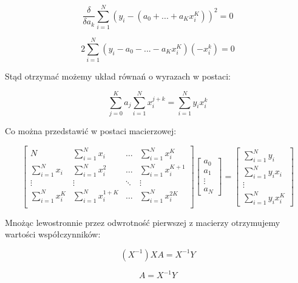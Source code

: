 \documentclass[a4paper]{article}
\begin{document}
\begin{equation}
\frac{\delta}{\delta a_k}\sum_{i=1}^N \left( y_i - \left(a _0 + ... + a_K x_i^K \right)\right)^2 = 0
\end{equation}

\begin{equation}
2\sum_{i=1}^N \left( y_i - a_0 - ... - a_K x_i^K \right) (- x_i^k) = 0
\end{equation}

Stąd otrzymać możemy układ równań o wyrazach w postaci:

\begin{equation}
\sum_{j=0}^K a_j \sum_{i=1}^N x_i^{j+k} = \sum_{i=1}^N y_i x_i^k
\end{equation}

Co można przedstawić w postaci macierzowej:

\begin{equation} \label{matrices}
\begin{bmatrix}
    N      & \sum_{i=1}^N x_i & \dots & \sum_{i=1}^N x_i^{K} \\
    \sum_{i=1}^N x_i      & \sum_{i=1}^N x_i^2 & \dots & \sum_{i=1}^N x_i^{K+1} \\
    \vdots & \vdots & \ddots & \vdots \\
\sum_{i=1}^N x_i^K      & \sum_{i=1}^N x_i^{1+K} & \dots & \sum_{i=1}^N x_i^{2K}\\
\end{bmatrix}
\begin{bmatrix}
    a_0	\\
    a_1	\\
    \vdots	\\
    a_N
\end{bmatrix}
=
\begin{bmatrix}
    \sum_{i=1}^N y_i	\\
    \sum_{i=1}^N y_i x_i	\\
    \vdots	\\
    \sum_{i=1}^N y_i x_i^K
\end{bmatrix}
\end{equation}

Mnożąc lewostronnie przez odwrotność pierwszej z macierzy otrzymujemy wartości współczynników:

\begin{equation}
(X^{-1}) X A = X^{-1}Y
\end{equation}

\begin{equation}
A = X^{-1}Y
\end{equation}
\end{document}
